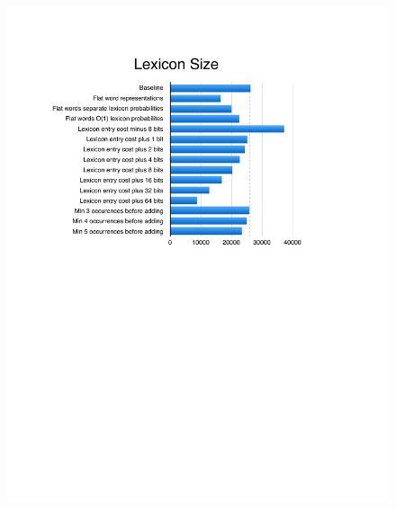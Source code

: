 \documentclass[11pt, oneside, fleqn]{article}
\begin{document}
  \begin{figure}[h]
  \includegraphics{./figure/lexicon_size.pdf}
  \end{figure}
\end{document}
